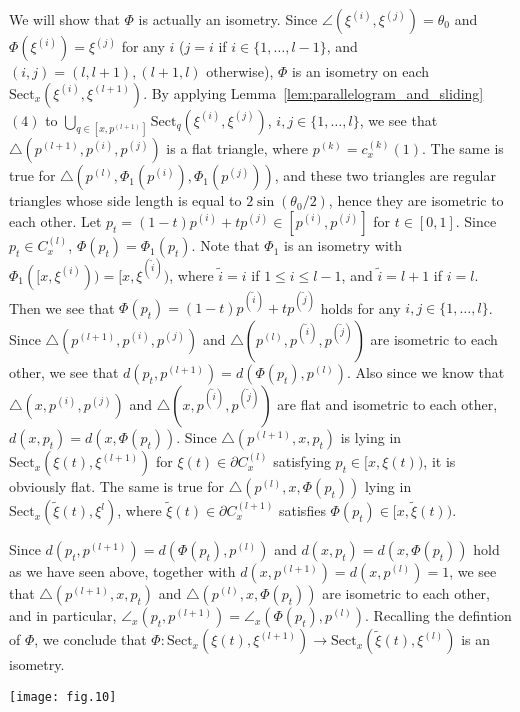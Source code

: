 \documentclass[12pt]{amsart}
\numberwithin{equation}{section}
\theoremstyle{plain}
\theoremstyle{definition}
\theoremstyle{remark}
\newcommand{\p}[1]{p^{(#1)}}
\newcommand{\xxi}[1]{\xi^{(#1)}}
\newcommand{\ray}[1]{[#1)}
\newcommand{\cc}[2]{c_{#1}^{#2}}
\newcommand{\tri}[3]{\triangle(#1,#2,#3)}
\newcommand{\sect}[3][]{\mathrm{Sect}_{#1}(#2,#3)}
\newcommand{\cone}[2][]{C_{#1}^{(#2)}}
\newcommand{\zure}{\theta_0}
\begin{document}
 We will show that $\Phi$ is actually an isometry. 
 Since 
 $\angle(\xxi{i},\xxi{j})=\zure$ and 
 $\Phi(\xxi{i})=\xxi{j}$ for any $i$
 ($j=i$ if $i \in \{1,\dots, l-1\}$, and $(i,j)=(l,l+1), (l+1,l)$
 otherwise), 
 $\Phi$ is an isometry on each 
 $\sect[x]{\xxi{i}}{\xxi{l+1}}$. 
 By applying Lemma~\ref{lem:parallelogram_and_sliding} $(4)$ to
 $\bigcup_{q \in [x,\p{l+1}]} \sect[q]{\xxi{i}}{\xxi{j}}$, 
 $i,j \in \{1,\dots, l\}$, 
 we see that 
 $\tri{\p{l+1}}{\p{i}}{\p{j}}$ is a flat triangle, where
 $\p{k}=\cc{x}{(k)}(1)$.  
 The same is true for $\tri{\p{l}}{\Phi_1(\p{i})}{\Phi_1(\p{j})}$, and
 these two triangles are regular triangles whose side length is equal to
 $2\sin (\zure/2)$, hence they are isometric to each other. 
 Let $p_t=(1-t)\p{i}+ t\p{j}\in [\p{i},\p{j}]$ for $t \in [0,1]$. 
 Since $p_t \in \cone[x]{l}$, $\Phi(p_t)=\Phi_1(p_t)$. 
 Note that $\Phi_1$ is an isometry with 
 $\Phi_1(\ray{x,\xxi{i}})=\ray{x,\xxi{\tilde i}}$, where
 $\tilde i=i$ if $1\leq i \leq l-1$, and $\tilde i=l+1$ if $i=l$. 
 Then we see that
 $\Phi(p_t)=(1-t)\p{\tilde i}+t \p{\tilde j}$ holds for any
 $i,j \in \{1,\dots, l\}$. 
 Since $\tri{\p{l+1}}{\p{i}}{\p{j}}$ and 
 $\tri{\p{l}}{\p{\tilde i}}{\p{\tilde j}}$ are isometric to each
 other,  we see that $d(p_t, \p{l+1})=d(\Phi(p_t),\p{l})$.  
 Also since we know that $\tri{x}{\p{i}}{\p{j}}$ and 
 $\tri{x}{\p{\tilde i}}{\p{\tilde j}}$ are flat and isometric
 to each other, $d(x, p_t)=d(x,\Phi(p_t))$. 
 Since
 $\tri{\p{l+1}}{x}{p_t}$ is lying in $\sect[x]{\xi(t)}{\xxi{l+1}}$
 for $\xi(t) \in \partial \cone[x]{l}$ satisfying 
 $p_t \in \ray{x,\xi(t)}$, it is obviously flat. 
 The same is true for $\tri{\p{l}}{x}{\Phi(p_t)}$ lying in 
 $\sect[x]{\tilde\xi(t)}{\xi^{l}}$, where
 $\tilde\xi(t) \in \partial \cone[x]{l+1}$ satisfies
 $\Phi(p_t) \in \ray{x,\tilde\xi(t)}$. 

\noindent
\begin{minipage}[c]{8cm}
 Since $d(p_t, \p{l+1})=d(\Phi(p_t), \p{l})$ and 
 $d(x, p_t)=d(x,\Phi(p_t))$ hold as we have seen above, 
 together with $d(x,\p{l+1})=d(x,\p{l})=1$, we see
 that $\tri{\p{l+1}}{x}{p_t}$ and $\tri{\p{l}}{x}{\Phi(p_t)}$
 are isometric to each other, and in particular, 
 $\angle_{x}(p_t,\p{l+1})=\angle_{x}(\Phi(p_t),\p{l})$.
 Recalling the defintion of $\Phi$, we conclude that 
 $\Phi \colon \sect[x]{\xi(t)}{\xxi{l+1}} \rightarrow
 \sect[x]{\tilde\xi(t)}{\xi^{(l)}}$
is an isometry. 
\end{minipage}
\begin{minipage}[c]{6cm}
 \vspace{-2cm}
 \hspace{1.7cm}
 \texttt{[image: fig.10]}
\end{minipage}
\end{document}
